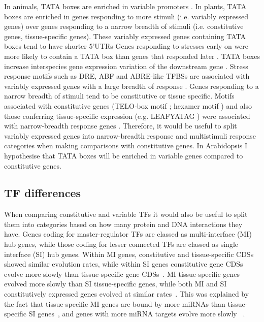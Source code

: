 \documentclass[../main.tex]{subfiles}
\begin{document}
In animals, TATA boxes are enriched in variable promoters \autocite{engstromGenomicRegulatoryBlocks2007,carninciGenomewideAnalysisMammalian2006}.
In plants, TATA boxes are enriched in genes responding to more stimuli (i.e. variably expressed genes) over genes responding to a narrow breadth of stimuli (i.e. constitutive genes, tissue-specific genes).
These variably expressed genes containing TATA boxes tend to have shorter 5'UTRs \autocite{waltherRegulatoryCodeTranscriptional2007,molinaGenomeWideAnalysis2005,lichtenbergWordLandscapeNoncoding2009}
Genes responding to stresses early on were more likely to contain a TATA box than genes that responded later \autocite{waltherRegulatoryCodeTranscriptional2007}.
TATA boxes increase interspecies gene expression variation of the downstream gene \autocite{tiroshGeneticSignatureInterspecies2006}.
Stress response motifs such as DRE, ABF and ABRE-like TFBSs \autocite{yamaguchi-shinozakiNovelCisactingElement1994} are associated with variably expressed genes with a large breadth of response \autocite{waltherRegulatoryCodeTranscriptional2007}.
Genes responding to a narrow breadth of stimuli tend to be constitutive or tissue specific.
Motifs associated with constitutive genes (TELO-box motif \autocite{tremousayguePlantInterstitialTelomere1999}; hexamer motif \autocite{chaubetIdentificationCiselementsRegulating1996}) and also those conferring tissue-specific expression (e.g. LEAFYATAG \autocite{kamiyaIsolationCharacterizationRice2003}) were associated with narrow-breadth response genes \autocite{waltherRegulatoryCodeTranscriptional2007}. Therefore, it would be useful to split variably expressed genes into narrow-breadth response and multistimuli response categories when making comparisons with constitutive genes.
In Arabidopsis I hypothesise that TATA boxes will be enriched in variable genes compared to constitutive genes.

\subsection{TF differences}

When comparing constitutive and variable TFs it would also be useful to split them into categories based on how many protein and DNA interactions they have. 
Genes coding for master-regulator TFs are classed as multi\hyp{}interface (MI) hub genes, while those coding for lesser connected TFs are classed as single interface (SI) hub genes.
Within MI genes, constitutive and tissue-specific CDSs showed similar evolution rates, while within SI genes constitutive gene CDSs evolve more slowly than tissue-specific gene CDSs~\autocite{podderMultifunctionalityDominantlyDetermines2009}.
MI tissue-specific genes evolved more slowly than SI tissue-specific genes, while both MI and SI constitutively expressed genes evolved at similar rates~\autocite{biswasEvolutionaryRateHeterogeneity2018}.
This was explained by the fact that tissue-specific MI genes are bound by more miRNAs than tissue-specific SI genes~\autocite{biswasEvolutionaryRateHeterogeneity2018}, and genes with more miRNA targets evolve more slowly ~\autocite{chengRelationshipEvolutionMicroRNA2009}.
\end{document}

